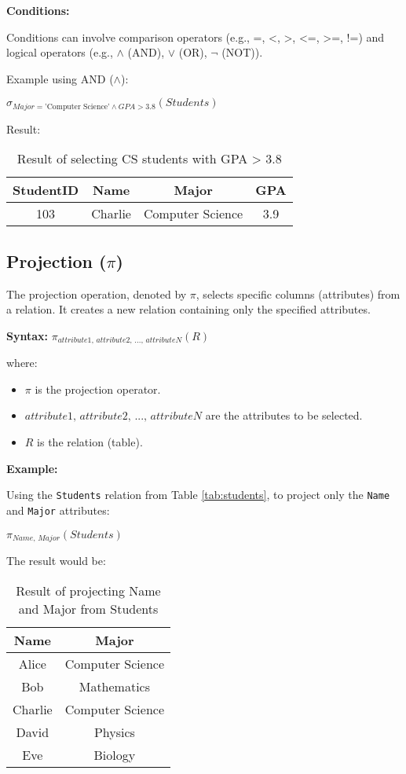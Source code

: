 \documentclass[12pt]{book}
\begin{document}
\textbf{Conditions:}

Conditions can involve comparison operators (e.g., =, <, >, <=, >=, !=) and logical operators (e.g., $\land$ (AND), $\lor$ (OR), $\lnot$ (NOT)).

Example using AND ($\land$):

$\sigma_{\textit{Major} = \text{'Computer Science'} \land \textit{GPA} > 3.8}(\mathit{Students})$

Result:

\begin{table}[htbp]
\centering
\begin{tabular}{@{}cccc@{}}
\toprule
StudentID & Name & Major & GPA \\
\midrule
103 & Charlie & Computer Science & 3.9 \\
\bottomrule
\end{tabular}
\caption{Result of selecting CS students with GPA > 3.8}
\label{tab:select_cs_gpa_students}
\end{table}


\subsection{Projection ($\pi$)}

The projection operation, denoted by $\pi$, selects specific columns (attributes) from a relation. It creates a new relation containing only the specified attributes.

\textbf{Syntax:} $\pi_{\textit{attribute1, attribute2, ..., attributeN}}(\mathit{R})$

where:
\begin{itemize}
    \item $\pi$ is the projection operator.
    \item $\textit{attribute1, attribute2, ..., attributeN}$ are the attributes to be selected.
    \item $\mathit{R}$ is the relation (table).
\end{itemize}

\textbf{Example:}

Using the \texttt{Students} relation from Table \ref{tab:students}, to project only the \texttt{Name} and \texttt{Major} attributes:

$\pi_{\textit{Name, Major}}(\mathit{Students})$

The result would be:

\begin{table}[htbp]
\centering
\begin{tabular}{@{}cc@{}}
\toprule
Name & Major \\
\midrule
Alice & Computer Science \\
Bob & Mathematics \\
Charlie & Computer Science \\
David & Physics \\
Eve & Biology \\
\bottomrule
\end{tabular}
\caption{Result of projecting Name and Major from Students}
\label{tab:project_name_major}
\end{table}
\end{document}
